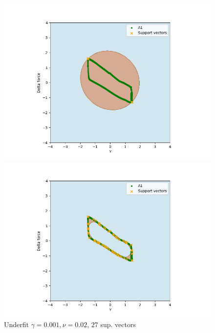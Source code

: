             \begin{figure}[]
                \begin{minipage}[b]{0.5\linewidth}
                    \centering
                    \includegraphics[width = \textwidth]{figures/analysis/oneclass_servo/A1_nu_0001_gamma_002.png}
                    \caption*{Underfit $\gamma = 0.001, \nu = 0.02$, $27$ sup. vectors}
                \end{minipage}
                \hfill
                \begin{minipage}[b]{0.5\linewidth}
                    \centering
                    \includegraphics[width = \textwidth]{figures/analysis/oneclass_servo/A1_nu_0001_gamma_8.png}

\end{minipage}
\end{figure}
